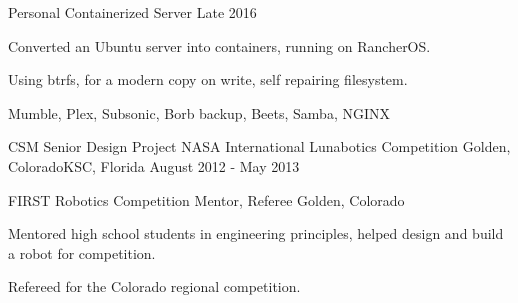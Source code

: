 

\begin{cventries}

  \cventry
    {Personal} %
    {Containerized Server} %
    {} %
    {Late 2016} %
    {
      \begin{cvitems} %
        \item {Converted an Ubuntu server into containers, running on RancherOS.}
        \item {Using btrfs, for a modern copy on write, self repairing filesystem.}
        \item {Mumble, Plex, Subsonic, Borb backup, Beets, Samba, NGINX}
      \end{cvitems}
    }

  \cventry
    {CSM Senior Design Project} %
    {NASA International Lunabotics Competition} %
    {Golden, Colorado{\enskip\cdotp\enskip}KSC, Florida} %
    {August 2012 - May 2013} %
    {
    }

  \cventry
    {FIRST Robotics Competition} %
    {Mentor, Referee} %
    {Golden, Colorado} %
    {} %
    {
      \begin{cvitems} %
        \item {Mentored high school students in engineering principles, helped design and build a robot for competition.}
        \item {Refereed for the Colorado regional competition.}
      \end{cvitems}
    }

\end{cventries}

